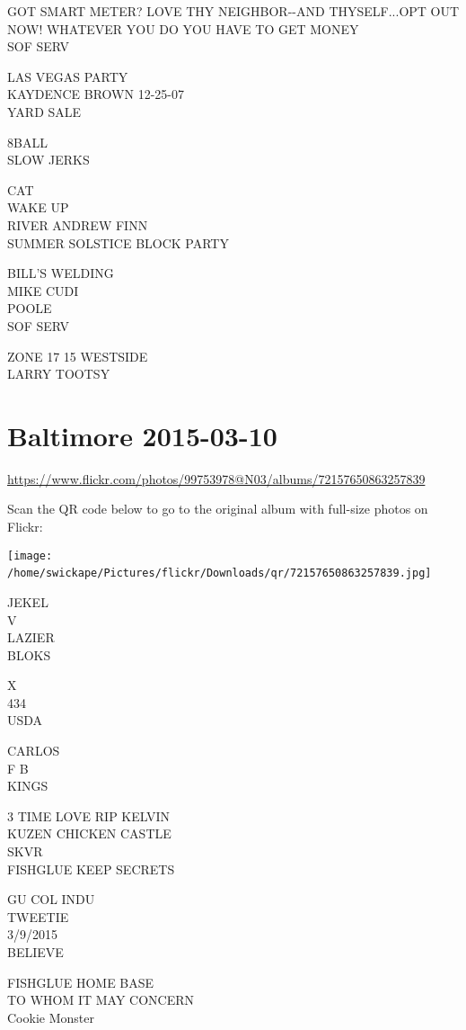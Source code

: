 \documentclass[10pt,letterpaper]{article}
\begin{document}
GOT SMART METER? LOVE THY NEIGHBOR{-}{-}AND THYSELF...OPT OUT NOW!  WHATEVER YOU DO YOU HAVE TO GET MONEY\\
SOF SERV

LAS VEGAS PARTY\\
KAYDENCE BROWN 12{-}25{-}07\\
YARD SALE

8BALL\\
SLOW JERKS

CAT\\
WAKE UP\\
RIVER ANDREW FINN\\
SUMMER SOLSTICE BLOCK PARTY

BILL'S WELDING\\
MIKE CUDI\\
POOLE\\
SOF SERV

ZONE 17 15 WESTSIDE\\
LARRY TOOTSY
\

\section*{Baltimore 2015-03-10}

\url{https://www.flickr.com/photos/99753978@N03/albums/72157650863257839}

Scan the QR code below to go to the original album with full-size photos on Flickr:

\texttt{[image: /home/swickape/Pictures/flickr/Downloads/qr/72157650863257839.jpg]}
\

JEKEL\\
V\\
LAZIER\\
BLOKS

X\\
434\\
USDA

CARLOS\\
F B\\
KINGS

3 TIME LOVE RIP KELVIN\\
KUZEN CHICKEN CASTLE\\
SKVR\\
FISHGLUE KEEP SECRETS

GU COL INDU\\
TWEETIE\\
3/9/2015\\
BELIEVE

FISHGLUE HOME BASE\\
TO WHOM IT MAY CONCERN\\
Cookie Monster
\end{document}
